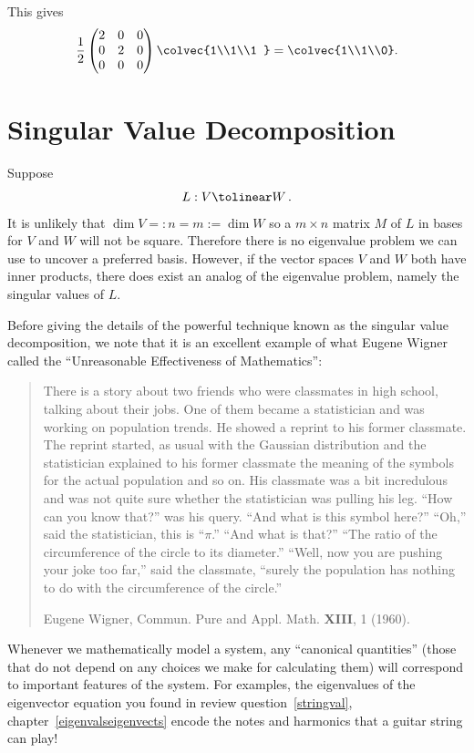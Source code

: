 \begin{example}
This gives 
\[\frac12 \begin{pmatrix}
 2 & 0 &0 \\
0 & 2  &0\\
0 & 0 &0
\end{pmatrix}
\colvec{1\\1\\1 } = \colvec{1\\1\\0} .\]
\end{example}



\section{Singular Value Decomposition}

Suppose 
\[
L:V\tolinear W\, .
\]
It is unlikely that $\dim V=:n=m:=\dim W$ so a $m\times n$ matrix $M$ of $L$ in bases for $V$ and $W$ will not be square.
Therefore there is no eigenvalue problem  we can use to uncover a preferred basis. However, if the vector spaces $V$ and 
$W$ both have inner products, there does exist an analog of the eigenvalue problem, namely the singular values of $L$.

Before giving the details of the powerful technique known as the singular value decomposition, we note that it is an 
excellent example of what Eugene Wigner called the ``Unreasonable Effectiveness of Mathematics'':
\begin{quote}{\scriptsize
There is a story about two friends who were classmates in high school, talking about their jobs. One of them became a statistician
and was working on population trends. He showed a reprint to his former classmate.
The reprint started, as usual with the Gaussian distribution and the statistician explained
to his former classmate the meaning of the symbols for the actual population and so on. His classmate
was a bit incredulous and was not quite sure whether the statistician was pulling his leg. ``How can you 
know that?'' was his query. ``And what is this symbol here?'' ``Oh,'' said the statistician, this is ``$\pi$.''
``And what is that?'' ``The ratio of the circumference of the circle to its diameter.'' ``Well, now
you are pushing your joke too far,'' said the classmate, ``surely the population has nothing to do with the 
circumference of the circle.''


Eugene Wigner, Commun. Pure and Appl. Math. {\bf XIII}, 1 (1960).
}
\end{quote}
Whenever we mathematically model a system, any ``canonical quantities'' 
(those that  %
do not
depend on any choices we make for calculating them) will correspond to important features of the system. For examples, the eigenvalues
of the eigenvector equation you found in review question~\ref{stringval}, chapter~\ref{eigenvalseigenvects} encode the notes and harmonics that a guitar string can play! 

